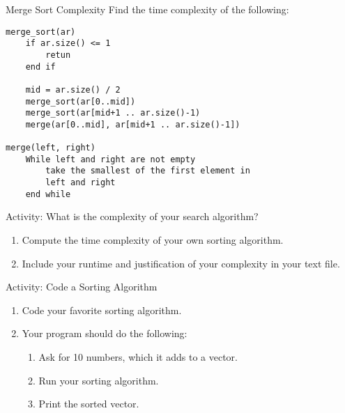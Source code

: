 \documentclass[]{beamer}
\begin{document}
\begin{frame}[fragile]{Merge Sort Complexity}
Find the time complexity of the following:
\begin{verbatim}
merge_sort(ar)
    if ar.size() <= 1 
        retun
    end if

    mid = ar.size() / 2
    merge_sort(ar[0..mid])
    merge_sort(ar[mid+1 .. ar.size()-1) 
    merge(ar[0..mid], ar[mid+1 .. ar.size()-1])

merge(left, right)
    While left and right are not empty
        take the smallest of the first element in
        left and right
    end while
\end{verbatim}
\end{frame}

\begin{frame}{Activity: What is the complexity of your search algorithm?}
\begin{enumerate}
    \item Compute the time complexity of your own sorting algorithm.
    \item Include your runtime and justification of your complexity in
        your text file.
\end{enumerate}
\end{frame}

\begin{frame}{Activity: Code a Sorting Algorithm}
\begin{enumerate}
    \item Code your favorite sorting algorithm.
    \item Your program should do the following:
    \begin{enumerate}
        \item Ask for 10 numbers, which it adds to a vector.
        \item Run your sorting algorithm.
        \item Print the sorted vector.
    \end{enumerate}
\end{enumerate}
\end{frame}
\end{document}
